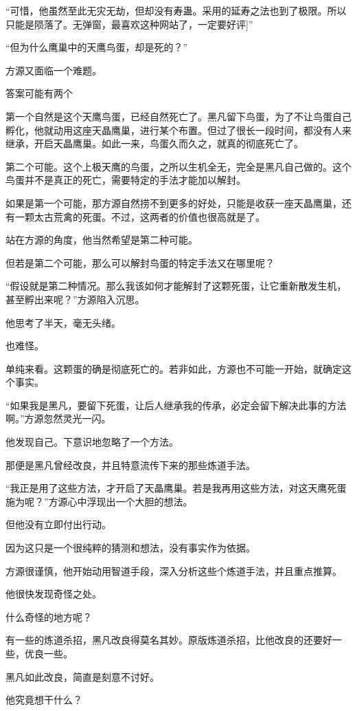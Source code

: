 \begin{this_body}
“可惜，他虽然至此无灾无劫，但却没有寿蛊。采用的延寿之法也到了极限。所以只能是陨落了。无弹窗，最喜欢这种网站了，一定要好评]”

“但为什么鹰巢中的天鹰鸟蛋，却是死的？”

方源又面临一个难题。

答案可能有两个

第一个自然是这个天鹰鸟蛋，已经自然死亡了。黑凡留下鸟蛋，为了不让鸟蛋自己孵化，他就动用这座天晶鹰巢，进行某个布置。但过了很长一段时间，都没有人来继承，开启天晶鹰巢。如此一来，鸟蛋久而久之，就真的彻底死亡了。

第二个可能。这个上极天鹰的鸟蛋，之所以生机全无，完全是黑凡自己做的。这个鸟蛋并不是真正的死亡，需要特定的手法才能加以解封。

如果是第一个可能，那方源自然捞不到更多的好处，只能是收获一座天晶鹰巢，还有一颗太古荒禽的死蛋。不过，这两者的价值也很高就是了。

站在方源的角度，他当然希望是第二种可能。

但若是第二个可能，那么可以解封鸟蛋的特定手法又在哪里呢？

“假设就是第二种情况。那么我该如何才能解封了这颗死蛋，让它重新散发生机，甚至孵出来呢？”方源陷入沉思。

他思考了半天，毫无头绪。

也难怪。

单纯来看。这颗蛋的确是彻底死亡的。若非如此，方源也不可能一开始，就确定这个事实。

“如果我是黑凡，要留下死蛋，让后人继承我的传承，必定会留下解决此事的方法啊。”方源忽然灵光一闪。

他发现自己。下意识地忽略了一个方法。

那便是黑凡曾经改良，并且特意流传下来的那些炼道手法。

“我正是用了这些方法，才开启了天晶鹰巢。若是我再用这些方法，对这天鹰死蛋施为呢？”方源心中浮现出一个大胆的想法。

但他没有立即付出行动。

因为这只是一个很纯粹的猜测和想法，没有事实作为依据。

方源很谨慎，他开始动用智道手段，深入分析这些个炼道手法，并且重点推算。

他很快发现奇怪之处。

什么奇怪的地方呢？

有一些的炼道杀招，黑凡改良得莫名其妙。原版炼道杀招，比他改良的还要好一些，优良一些。

黑凡如此改良，简直是刻意不讨好。

他究竟想干什么？


\end{this_body}
